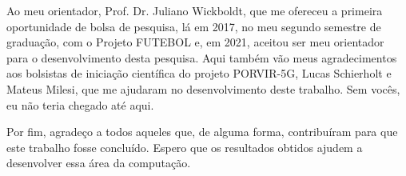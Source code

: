Ao meu orientador, Prof. Dr. Juliano Wickboldt, que me ofereceu a primeira oportunidade de bolsa de pesquisa, lá em 2017, no meu segundo semestre de graduação, com o Projeto FUTEBOL e, em 2021, aceitou ser meu orientador para o desenvolvimento desta pesquisa.
Aqui também vão meus agradecimentos aos bolsistas de iniciação científica do projeto PORVIR-5G, Lucas Schierholt e Mateus Milesi, que me ajudaram no desenvolvimento deste trabalho.
Sem vocês, eu não teria chegado até aqui.

Por fim, agradeço a todos aqueles que, de alguma forma, contribuíram para que este trabalho fosse concluído.
Espero que os resultados obtidos ajudem a desenvolver essa área da computação.
